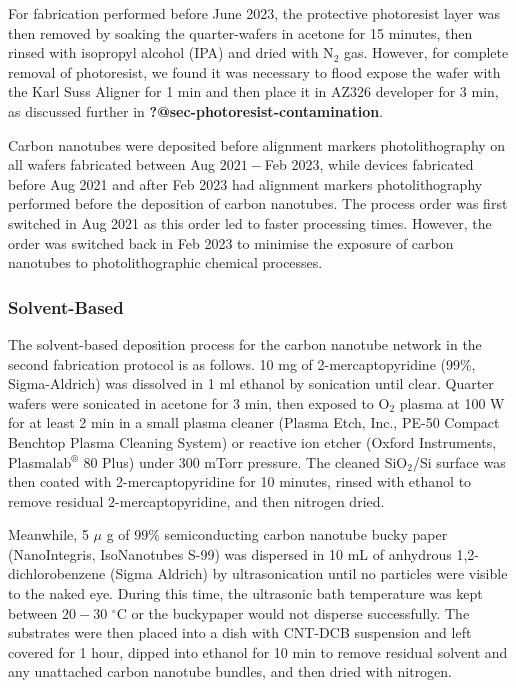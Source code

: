 \documentclass[
  letterpaper,
  DIV=11,
  numbers=noendperiod]{scrartcl}
\begin{document}
For fabrication performed before June 2023, the protective photoresist
layer was then removed by soaking the quarter-wafers in acetone for 15
minutes, then rinsed with isopropyl alcohol (IPA) and dried with N\(_2\)
gas. However, for complete removal of photoresist, we found it was
necessary to flood expose the wafer with the Karl Suss Aligner for 1 min
and then place it in AZ326 developer for 3 min, as discussed further in
\textbf{?@sec-photoresist-contamination}.

Carbon nanotubes were deposited before alignment markers
photolithography on all wafers fabricated between Aug \(2021-\)Feb 2023,
while devices fabricated before Aug 2021 and after Feb 2023 had
alignment markers photolithography performed before the deposition of
carbon nanotubes. The process order was first switched in Aug 2021 as
this order led to faster processing times. However, the order was
switched back in Feb 2023 to minimise the exposure of carbon nanotubes
to photolithographic chemical processes.

\hypertarget{solvent-based}{%
\subsubsection{Solvent-Based}\label{solvent-based}}

The solvent-based deposition process for the carbon nanotube network in
the second fabrication protocol is as follows. 10 mg of
2-mercaptopyridine (99\%, Sigma-Aldrich) was dissolved in 1 ml ethanol
by sonication until clear. Quarter wafers were sonicated in acetone for
3 min, then exposed to O\(_2\) plasma at 100 W for at least 2 min in a
small plasma cleaner (Plasma Etch, Inc., PE-50 Compact Benchtop Plasma
Cleaning System) or reactive ion etcher (Oxford Instruments,
Plasmalab\(^\circledR\) 80 Plus) under 300 mTorr pressure. The cleaned
SiO\(_2\)/Si surface was then coated with 2-mercaptopyridine for 10
minutes, rinsed with ethanol to remove residual \(2\)-mercaptopyridine,
and then nitrogen dried.

Meanwhile, 5 \(\mu\) g of 99\% semiconducting carbon nanotube bucky
paper (NanoIntegris, IsoNanotubes S-99) was dispersed in 10 mL of
anhydrous 1,2-dichlorobenzene (Sigma Aldrich) by ultrasonication until
no particles were visible to the naked eye. During this time, the
ultrasonic bath temperature was kept between \(20-30\) \(^\circ\)C or
the buckypaper would not disperse successfully. The substrates were then
placed into a dish with CNT-DCB suspension and left covered for 1 hour,
dipped into ethanol for 10 min to remove residual solvent and any
unattached carbon nanotube bundles, and then dried with nitrogen.
\end{document}
